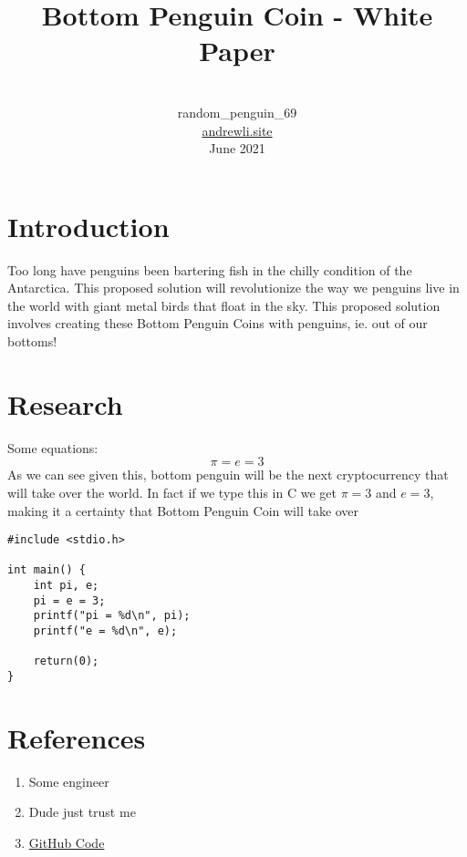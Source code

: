 \documentclass[12pt, titlepage]{article}
\title{Bottom Penguin Coin - White Paper}
\author{\\random\_penguin\_69\\\href{https://andrewli.site/}{andrewli.site}\\June 2021}
\date{}
\begin{document}
\maketitle

\section{Introduction}
Too long have penguins been bartering fish in the chilly condition of the Antarctica. This proposed solution will revolutionize the way we penguins live in the world with giant metal birds that float in the sky. This proposed solution involves creating these Bottom Penguin Coins with penguins, ie. out of our bottoms! 

\section{Research}
Some equations:
$$
\pi = e = 3
$$
As we can see given this, bottom penguin will be the next cryptocurrency that will take over the world. In fact if we type this in C we get $\pi = 3$ and $e = 3$, making it a certainty that Bottom Penguin Coin will take over
\begin{verbatim}
#include <stdio.h>

int main() {
    int pi, e;
    pi = e = 3;
    printf("pi = %d\n", pi);
    printf("e = %d\n", e);
    
    return(0);
}
\end{verbatim}
\newpage

\section{References}
\begin{enumerate}
  \item Some engineer
  \item Dude just trust me
  \item \href{https://github.com/Zeyu-Li/bottom-penguin}{GitHub Code}
\end{enumerate}
\end{document}

